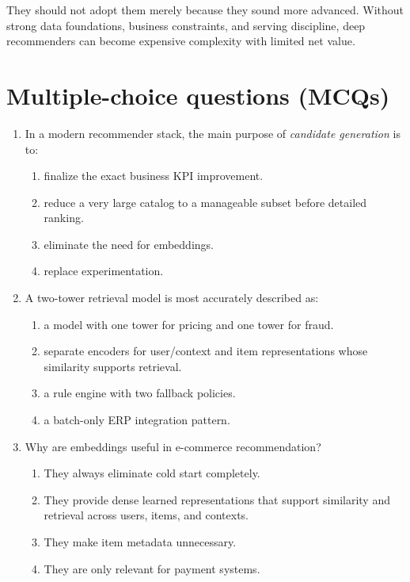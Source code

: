 They should not adopt them merely because they sound more advanced.
Without strong data foundations, business constraints, and serving discipline, deep recommenders can become expensive complexity with limited net value.

\section{Multiple-choice questions (MCQs)}
\begin{enumerate}
  \item In a modern recommender stack, the main purpose of \emph{candidate generation} is to:
  \begin{enumerate}
    \item finalize the exact business KPI improvement.
    \item reduce a very large catalog to a manageable subset before detailed ranking.
    \item eliminate the need for embeddings.
    \item replace experimentation.
  \end{enumerate}

  \item A two-tower retrieval model is most accurately described as:
  \begin{enumerate}
    \item a model with one tower for pricing and one tower for fraud.
    \item separate encoders for user/context and item representations whose similarity supports retrieval.
    \item a rule engine with two fallback policies.
    \item a batch-only ERP integration pattern.
  \end{enumerate}

  \item Why are embeddings useful in e-commerce recommendation?
  \begin{enumerate}
    \item They always eliminate cold start completely.
    \item They provide dense learned representations that support similarity and retrieval across users, items, and contexts.
    \item They make item metadata unnecessary.
    \item They are only relevant for payment systems.
  \end{enumerate}


\end{enumerate}
